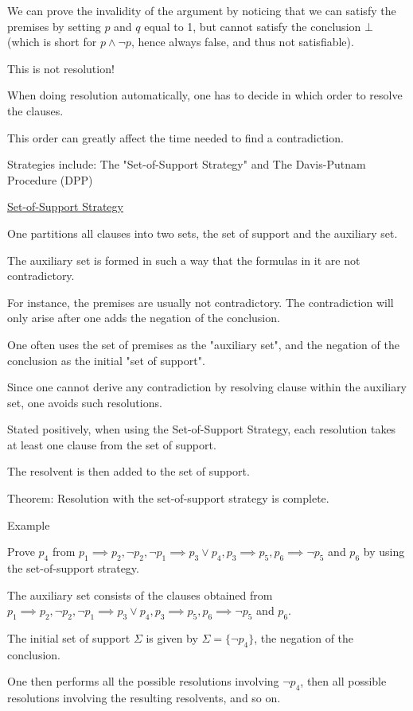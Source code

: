 \documentclass{article}
\begin{document}
We can prove the invalidity of the argument by noticing that we can satisfy the premises by setting $p$ and $q$ equal to 1, but cannot satisfy the conclusion $\bot$ (which is short for $p \wedge \neg p$, hence always false, and thus not satisfiable). 

This is not resolution!


When doing resolution automatically, one has to decide in which order to resolve the clauses. 

This order can greatly affect the time needed to find a contradiction.

Strategies include: The "Set-of-Support Strategy" and The Davis-Putnam Procedure (DPP)

\underline{Set-of-Support Strategy}

One partitions all clauses into two sets, the set of support and the auxiliary set. 

The auxiliary set is formed in such a way that the formulas in it are not contradictory.

For instance, the premises are usually not contradictory. The contradiction will only arise after one adds the negation of the conclusion.

One often uses the set of premises as the "auxiliary set", and the negation of the conclusion as the initial "set of support".

Since one cannot derive any contradiction by resolving clause within the auxiliary set, one avoids such resolutions. 

Stated positively, when using the Set-of-Support Strategy, each resolution takes at least one clause from the set of support.

The resolvent is then added to the set of support.

Theorem: Resolution with the set-of-support strategy is complete.

Example

Prove $p_4$ from $p_1 \implies p_2, \neg p_2, \neg p_1 \implies p_3 \vee p_4, p_3 \implies p_5, p_6 \implies \neg p_5$ and $p_6$ by using the set-of-support strategy.

The auxiliary set consists of the clauses obtained from $p_1 \implies p_2, \neg p_2, \neg p_1 \implies p_3 \vee p_4, p_3 \implies p_5, p_6 \implies \neg p_5$ and $p_6$. 

The initial set of support $\Sigma$ is given by $\Sigma = \{\neg p_4\}$, the negation of the conclusion.

One then performs all the possible resolutions involving $\neg p_4$, then all possible resolutions involving the resulting resolvents, and so on.
\end{document}
